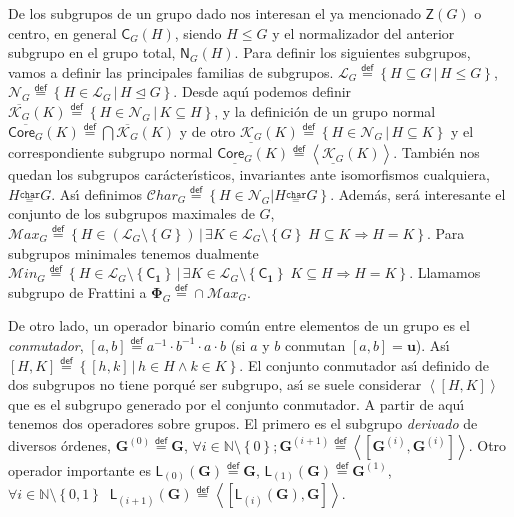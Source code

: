 \documentclass[final,12pt,a4paper,twoside,fleqn]{extbook}
\newcommand{\entreparentesis}[1]{\ensuremath{
        \left({#1}\right)
}}
\newcommand{\entrecorchetes}[1]{\ensuremath{
        \left\lbrack{#1}\right\rbrack
}}
\newcommand{\entreangulos}[1]{\ensuremath{\left\langle{#1}\right\rangle}}
\newcommand{\mathdef}{\ensuremath{\stackrel{\mathsf{def}}{{}={}}}}
\newcommand{\set}[1]{\ensuremath{\left\lbrace{#1}\right\rbrace}}
\newcommand{\extset}[2]{\ensuremath{
        \left\lbrace{#1}\,\vert\,{#2}\right\rbrace
}}
\newcommand{\setN}{\ensuremath{\mathds{N}}}
\newcommand{\ly}{\ensuremath{         \wedge         }}
\newcommand{\generadoporUitem}[1]{\ensuremath{
        \entreangulos{#1}
}}
\newcommand{\generadopor}[1]{\ensuremath{
        \generadoporUitem{#1}
}}
\newcommand{\grG}{\ensuremath{\mathbf{G}}}
\newcommand{\subgreq}{\ensuremath{\leqslant}}
\newcommand{\charsubgreq}{\ensuremath{\stackrel{\mathtt{char}}{{}_{=}}}}
\newcommand{\normsubgreq}{\ensuremath{\trianglelefteq}}
\newcommand{\grlattice}[1]{\ensuremath{
        {\mathcal{L}}_{#1}
}}
\newcommand{\normgrlattice}[1]{\ensuremath{{\mathcal{N}}_{#1}}}
\newcommand{\chargrlattice}[1]{\ensuremath{{\mathcal{C}har}_{#1}}}
\newcommand{\maxgrlattice}[1]{\ensuremath{{\mathcal{M}ax}_{#1}}}
\newcommand{\mingrlattice}[1]{\ensuremath{{\mathcal{M}in}_{#1}}}
\newcommand{\supcoregrlattice}[2]{\ensuremath{
        \overline{\mathcal{K}_{#1}}
        {\left({#2}\right)}
}}
\newcommand{\subcoregrlattice}[2]{\ensuremath{
        \underline{\mathcal{K}_{#1}}
        {\left({#2}\right)}
}}
\newcommand{\grclass}[1]{\ensuremath{\mathsf{#1}}}
\newcommand{\trivialgr}{\ensuremath{{\grclass{C}}_{\mathbf{1}}}}
\newcommand{\normalizador}[2]{\ensuremath{
        {{\mathsf{N}}_{#1}}
        {\left({#2}\right)}
}}
\newcommand{\centralizador}[2]{\ensuremath{
        {{\mathsf{C}}_{#1}}
        {\left({#2}\right)}
}}
\newcommand{\centro}[1]{\ensuremath{
        {\mathsf{Z}}
        {\left({#1}\right)}
}}
\newcommand{\frattini}[1]{\ensuremath{{\mathbf{\Phi }}_{#1}}}
\newcommand{\grderivado}[2]{\ensuremath{
        {#1}^{\entreparentesis{#2}}
}}
\newcommand{\grLderivado}[2]{\ensuremath{
        {{\mathsf{L}}_{\entreparentesis{#2}}}
        {\entreparentesis{#1}}
}}
\newcommand{\conmutador}[2]{\ensuremath{
        \entrecorchetes{#1,#2}
}}
\newcommand{\grconmutador}[2]{\ensuremath{
        \generadopor{
            \entrecorchetes{#1,#2}
        }
}}
\newcommand{\supcore}[2]{\ensuremath{
        {\overline{{\bm{\mathsf{Core}}}_{#1}}}
        {\left({#2}\right)}
}}
\newcommand{\subcore}[2]{\ensuremath{
        {\underline{{\bm{\mathsf{Core}}}_{#1}}}
        {\left({#2}\right)}
}}
\newcommand{\neutromult}{\ensuremath{\mathbf{u}}}
\newcommand{\unity}{\ensuremath{\neutromult}}
\theoremstyle{definition}
\theoremstyle{remark}
\begin{document}
De los subgrupos de un grupo dado nos interesan el ya mencionado $\centro{G}$
o centro, en general $\centralizador{G}{H}$, siendo $H \subgreq G$ y
el normalizador del anterior subgrupo en el grupo total,
$\normalizador{G}{H}$. Para definir
los siguientes subgrupos, vamos a definir las principales familias
de subgrupos.
$\grlattice{G}\mathdef\extset {H         \subseteq G} {H \subgreq G}$,
$\normgrlattice{G}\mathdef\extset {H         \in \grlattice{G}}{H\normsubgreq G}$.
Desde aqu{\'{\i}} podemos definir
$\supcoregrlattice{G}{K}\mathdef\extset{H         \in \normgrlattice{G}}{
K         \subseteq H}$,
y la definici\'on de un grupo normal
$\supcore{G}{K}\mathdef\bigcap\supcoregrlattice{G}{K}$
y de otro
$\subcoregrlattice{G}{K}\mathdef\extset{H          \in \normgrlattice{G}}{H         \subseteq K}$
y el correspondiente subgrupo normal
$\subcore{G}{K}
\mathdef
\generadopor{
    \subcoregrlattice{G}{K}
}$.
Tambi\'en nos quedan los subgrupos carácter{\'{\i}}sticos, invariantes ante
isomorfismos cualquiera, $ H \charsubgreq G $. As{\'{\i}} definimos
$\chargrlattice{G}\mathdef{\set{H          \in \normgrlattice{G}\vert{H \charsubgreq G}}}$.
Adem\'as, ser\'a interesante el conjunto de los subgrupos maximales de $G$,
$\maxgrlattice{G} \mathdef
\extset {H          \in \left({\grlattice{G}}\setminus\set{G}\right)}
        {
                     \exists          K          \in {\grlattice{G}}\setminus\set{G}\;
                                {H         \subseteq K         \Rightarrow          H=K}
        }
$.
Para subgrupos minimales tenemos dualmente
$\mingrlattice{G} \mathdef
\extset {H         \in {\grlattice{G}\setminus\set{\trivialgr}}}
{        \exists             K            \in {\grlattice{G}\setminus\set{\trivialgr}}
    \; K         \subseteq H          \Rightarrow            H=K}$.
Llamamos subgrupo de Frattini a $\frattini{G}\mathdef        \cap \maxgrlattice{G}$.

De otro lado, un operador binario com\'un entre elementos de un grupo es el \emph{conmutador},
$\conmutador{a}{b} \mathdef a^{-1}        \cdot b^{-1}        \cdot a         \cdot b$
(si $a$ y $b$ conmutan $\conmutador{a}{b}=\unity$).
As{\'{\i}} $\conmutador{H}{K}\mathdef \extset{\conmutador{h}{k}}
{h         \in H    \ly    k         \in K}$.
El conjunto conmutador as{\'{\i}} definido de dos subgrupos no tiene porqu\'e
ser subgrupo, as{\'{\i}} se suele considerar $\grconmutador{H}{K}$
que es el subgrupo generado por el conjunto conmutador.
A partir de aqu{\'{\i}} tenemos dos operadores
sobre grupos. El primero es el subgrupo \emph{derivado} de diversos \'ordenes,
$\grderivado{\grG}{0}\mathdef \grG$, $\forall i         \in \setN\setminus\set{0}; \grderivado{\grG}{i+1}\mathdef{\grconmutador{\grderivado{\grG}{i}}{\grderivado{\grG}{i}}}$.
Otro operador importante es
$\grLderivado{\grG}{0}\mathdef \grG$,
$\grLderivado{\grG}{1}\mathdef \grderivado{\grG}{1}$,
$
\forall i         \in \setN\setminus\set{0,1}\;\;
\grLderivado{\grG}{i+1}\mathdef
\grconmutador{\grLderivado{\grG}{i}}{\grG}
$.
\end{document}
